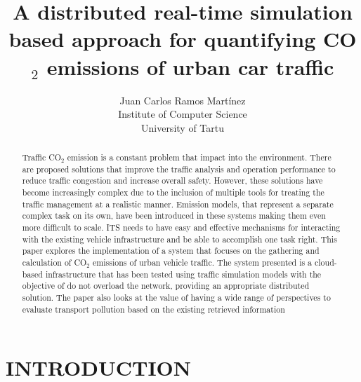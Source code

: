\documentclass[letter, 10pt, conference]{ieeeconf}
\title{\LARGE \bf A distributed real-time simulation based approach for quantifying CO$_2$ emissions of urban car traffic}
\author{ \parbox{4 in}{ \centering Juan Carlos Ramos Martínez \\
  Institute of Computer Science\\
  University of Tartu}}
\begin{document}
\maketitle
\thispagestyle{empty}
\pagestyle{empty}


\begin{abstract}

Traffic CO$_2$ emission is a constant problem that impact into the environment.
There are proposed solutions that improve the traffic analysis and operation performance to reduce traffic congestion and increase overall safety.
However, these solutions have become increasingly complex due to the inclusion of multiple tools for treating the traffic management at a realistic manner.
Emission models, that represent a separate complex task on its own, have been introduced in these systems making them even more difficult to scale.
ITS needs to have easy and effective mechanisms for interacting with the existing vehicle infrastructure and be able to accomplish one task right.
This paper explores the implementation of a system that focuses on the gathering and calculation of CO$_2$ emissions of urban vehicle traffic.
The system presented is a cloud-based infrastructure that has been tested using traffic simulation models with the objective of do not overload the network, providing an appropriate distributed solution.
The paper also looks at the value of having a wide range of perspectives to evaluate transport pollution based on the existing retrieved information

\end{abstract}

\section{INTRODUCTION}
\end{document}
